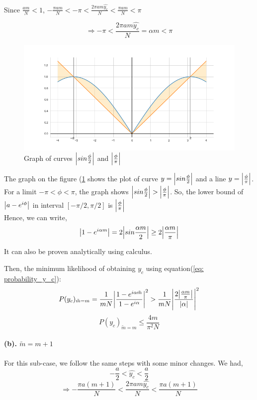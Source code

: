 Since $\frac{am}{N} < 1$,  $-\frac{\pi a m}{N} < -\pi< \frac{2\pi a m\hat{y_c}}{N} < \frac{\pi a m}{N} < \pi$
        
$$\Rightarrow -\pi< \frac{2\pi a m\hat{y_c}}{N}=\alpha m <  \pi$$
\begin{figure}[H]
    \centering
     \includegraphics[scale=0.4]{figures/sinx__2_less_than_x__pi.png}
    \caption{Graph of curves $\abs{sin\frac{\phi}{2} }$ and $\abs{\frac{\phi}{\pi}} $}
    \label{fig: sinx__2_less_than_x__pi}
\end{figure}
The graph on the figure (\ref{fig: sinx__2_less_than_x__pi} shows the plot of curve $y= \abs{sin\frac{\phi}{2}}$ and a line $y= \abs{\frac{\phi}{\pi}} $. For a limit $-\pi < \phi< \pi$, the graph shows $\abs{sin\frac{\phi}{2}} > \abs{\frac{\phi}{\pi}} $.
So, the lower bound of $\abs{a-e^{i\phi}}$ in interval $[-\pi/2, \pi/2]$ is $\abs{\frac{\phi}{\pi}}$
\\Hence, we can write,
$$\abs{1-e^{i\alpha m}} = 2\abs{sin\frac{\alpha m}{2}} \geq 2\abs{\frac{\alpha m}{\pi}} $$  

        
It can also be proven analytically using calculus.

Then, the minimum likelihood of obtaining $y_c$ using equation(\ref{eq: probability_y_c}): 
$$ P(y_c)_{\tilde{m}=m} = \frac{1}{mN}\abs{\frac{1-e ^{i\alpha \tilde{m}}}{1-e ^{i\alpha }}}^2 > \frac{1}{mN} \abs{\frac{2\abs{\frac{\alpha m}{\pi}}}{\abs{\alpha}}}^2$$
\begin{equation}
    P(y_c)_{\tilde{m}=m} \leq \frac{4m}{ \pi^2 N}
    \label{eq: probability_yc_m}
\end{equation}

\paragraph{(b). $\tilde{m} = m+1$\\}
For this sub-case, we follow the same steps with some minor changes. We had,
$$-\frac{a}{2} < \hat{y_c} < \frac{a}{2}$$
$$\Rightarrow -\frac{\pi a (m+1)}{N} < \frac{2\pi a m\hat{y_c}}{N} < \frac{\pi a (m+1)}{N} $$
        
